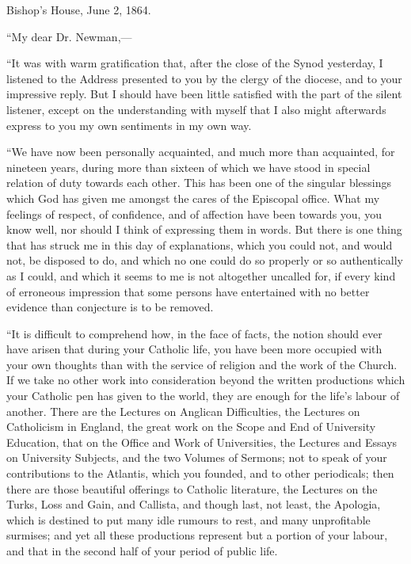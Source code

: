 Bishop's House, June 2, 1864.

``My dear Dr. Newman,—

``It was with warm gratification that, after the close of the Synod
yesterday, I listened to the Address presented to you by the clergy of
the diocese, and to your impressive reply. But I should have been little
satisfied with the part of the silent listener, except on the
understanding with myself that I also might afterwards express to you my
own sentiments in my own way.

``We have now been personally acquainted, and much more than
acquainted, for nineteen years, during more than sixteen of which we
have stood in special relation of duty towards each other. This has been
one of the singular blessings which God has given me amongst the
cares of the Episcopal office. What my feelings of respect, of
confidence, and of affection have been towards you, you know well, nor
should I think of expressing them in words. But there is one thing that
has struck me in this day of explanations, which you could not, and
would not, be disposed to do, and which no one could do so properly or
so authentically as I could, and which it seems to me is not altogether
uncalled for, if every kind of erroneous impression that some persons
have entertained with no better evidence than conjecture is to be
removed.

``It is difficult to comprehend how, in the face of facts, the
notion should ever have arisen that during your Catholic life, you have
been more occupied with your own thoughts than with the service of
religion and the work of the Church. If we take no other work into
consideration beyond the written productions which your Catholic pen has
given to the world, they are enough for the life's labour of another.
There are the Lectures on Anglican
Difficulties, the Lectures on
Catholicism in England, the great work on the Scope and End of
University Education, that on the Office and Work of Universities, the
Lectures and Essays on University Subjects, and the two Volumes of
Sermons; not to speak of your contributions to the Atlantis, which you
founded, and to other periodicals; then there are those beautiful
offerings to Catholic literature, the Lectures on the
Turks, Loss and Gain, and Callista, and though last, not least, the Apologia, which is
destined to put many idle rumours to rest, and many unprofitable
surmises; and yet all these productions represent but a portion of your
labour, and that in the second half of your period of public life.

